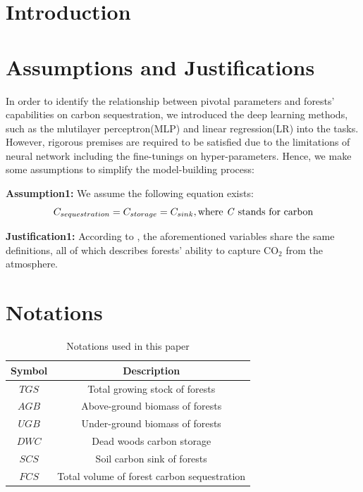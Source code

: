 \documentclass[12pt]{article}
\begin{document}
\section{Introduction}
\section{Assumptions and Justifications}
\hspace{2em}In order to identify the relationship between pivotal parameters and forests' capabilities on carbon sequestration, we introduced the deep learning methods, such as the mlutilayer perceptron(MLP) and linear regression(LR) into the tasks. However, rigorous premises are required to be satisfied due to the limitations of neural network including the fine-tunings on hyper-parameters. Hence, we make some assumptions to simplify the model-building process:

\textbf{Assumption1:} We assume the following equation exists:
\begin{equation}
	C_{sequestration}=C_{storage}=C_{sink}, \text{where \textit{C} stands for carbon}
\end{equation}
 
\textbf{Justification1:} According to \cite{1}\cite{2}, the aforementioned variables share the same definitions, all of which describes forests' ability to capture $\text{CO}_2$ from the atmosphere.
\section{Notations}
\begin{table}[h]
	\centering
	\caption{Notations used in this paper}
	\setlength{\tabcolsep}{70pt}
	\begin{tabular}{cc}
		\toprule[2pt]
		\textbf{Symbol} & \textbf{Description} \\
		\midrule[1.1pt]
		$TGS$ & Total growing stock of forests \\
		$AGB$ & Above-ground biomass of forests \\
		$UGB$ & Under-ground biomass of forests \\
		$DWC$ & Dead woods carbon storage\\
		$SCS$ & Soil carbon sink of forests \\
		$FCS$ & Total volume of forest carbon sequestration  \\
		\bottomrule[2pt]
	\end{tabular}
	\label{Notations}
\end{table}
\end{document}
